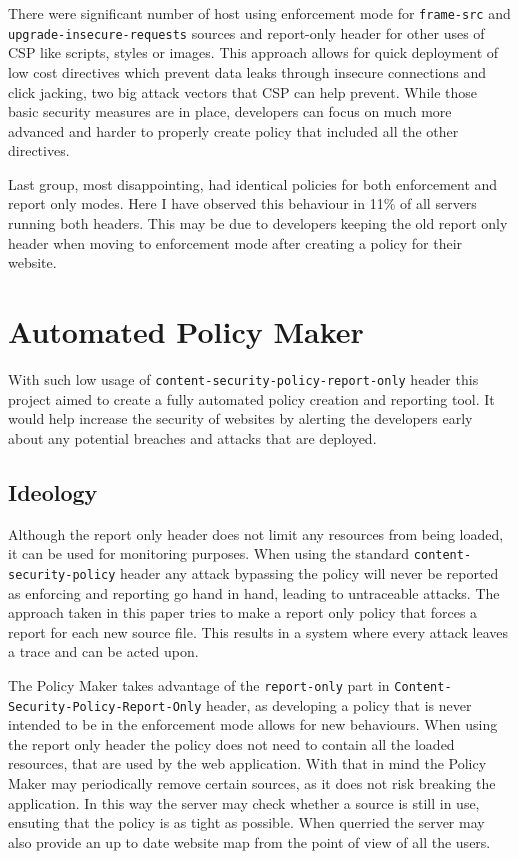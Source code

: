 There were significant number of host using enforcement mode for \texttt{frame-src} and \texttt{upgrade-insecure-requests} sources and report-only header for other uses of CSP like scripts, styles or images.
This approach allows for quick deployment of low cost directives which prevent data leaks through insecure connections and click jacking, two big attack vectors that CSP can help prevent.
While those basic security measures are in place, developers can focus on much more advanced and harder to properly create policy that included all the other directives.

Last group, most disappointing, had identical policies for both enforcement and report only modes.
Here I have observed this behaviour in 11\% of all servers running both headers.
This may be due to developers keeping the old report only header when moving to enforcement mode after creating a policy for their website.

\section{Automated Policy Maker}

With such low usage of \texttt{content-security-policy-report-only} header this project aimed to create a fully automated policy creation and reporting tool.
It would help increase the security of websites by alerting the developers early about any potential breaches and attacks that are deployed.


\subsection{Ideology}

Although the report only header does not limit any resources from being loaded, it can be used for monitoring purposes.
When using the standard \texttt{content-security-policy} header any attack bypassing the policy will never be reported as enforcing and reporting go hand in hand, leading to untraceable attacks.
The approach taken in this paper tries to make a report only policy that forces a report for each new source file.
This results in a system where every attack leaves a trace and can be acted upon.

The Policy Maker takes advantage of the \texttt{report-only} part in \texttt{Content-Security-Policy-Report-Only} header, as developing a policy that is never intended to be in the enforcement mode allows for new behaviours.
When using the report only header the policy does not need to contain all the loaded resources, that are used by the web application.
With that in mind the Policy Maker may periodically remove certain sources, as it does not risk breaking the application.
In this way the server may check whether a source is still in use, ensuting that the policy is as tight as possible. 
When querried the server may also provide an up to date website map from the point of view of all the users.

